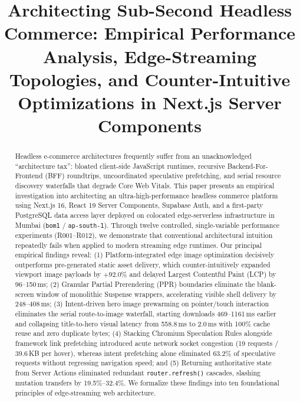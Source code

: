 \documentclass[conference]{IEEEtran}
\begin{document}
\title{Architecting Sub-Second Headless Commerce: Empirical Performance Analysis, Edge-Streaming Topologies, and Counter-Intuitive Optimizations in Next.js Server Components}

\author{
\and
{}
}

\maketitle

\begin{abstract}
Headless e-commerce architectures frequently suffer from an unacknowledged ``architecture tax'': bloated client-side JavaScript runtimes, recursive Backend-For-Frontend (BFF) roundtrips, uncoordinated speculative prefetching, and serial resource discovery waterfalls that degrade Core Web Vitals. This paper presents an empirical investigation into architecting an ultra-high-performance headless commerce platform using Next.js 16, React 19 Server Components, Supabase Auth, and a first-party PostgreSQL data access layer deployed on colocated edge-serverless infrastructure in Mumbai (\texttt{bom1} / \texttt{ap-south-1}). Through twelve controlled, single-variable performance experiments (R001--R012), we demonstrate that conventional architectural intuition repeatedly fails when applied to modern streaming edge runtimes. Our principal empirical findings reveal: (1) Platform-integrated edge image optimization decisively outperforms pre-generated static asset delivery, which counter-intuitively expanded viewport image payloads by +92.0\% and delayed Largest Contentful Paint (LCP) by 96--150\,ms; (2) Granular Partial Prerendering (PPR) boundaries eliminate the blank-screen window of monolithic Suspense wrappers, accelerating visible shell delivery by 248--408\,ms; (3) Intent-driven hero image prewarming on pointer/touch interaction eliminates the serial route-to-image waterfall, starting downloads 469--1161\,ms earlier and collapsing title-to-hero visual latency from 558.8\,ms to 2.0\,ms with 100\% cache reuse and zero duplicate bytes; (4) Stacking Chromium Speculation Rules alongside framework link prefetching introduced acute network socket congestion (19 requests / 39.6\,KB per hover), whereas intent prefetching alone eliminated 63.2\% of speculative requests without regressing navigation speed; and (5) Returning authoritative state from Server Actions eliminated redundant \texttt{router.refresh()} cascades, slashing mutation transfers by 19.5\%--32.4\%. We formalize these findings into ten foundational principles of edge-streaming web architecture.
\end{abstract}
\end{document}
